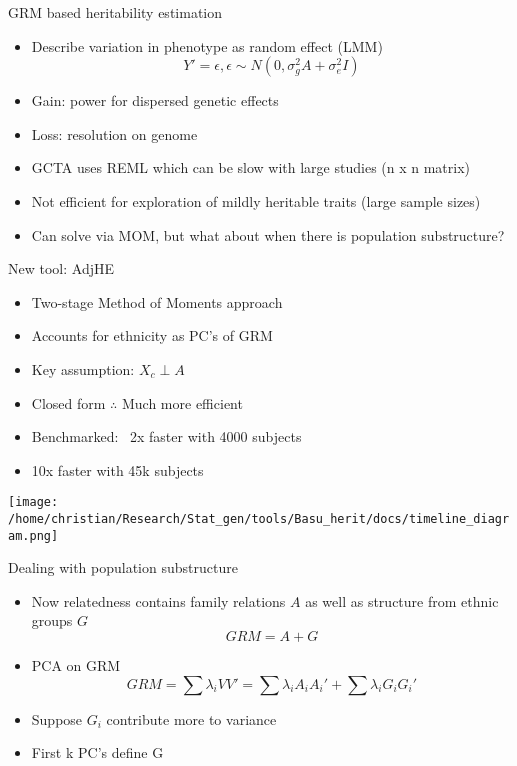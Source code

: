 \documentclass[
  ignorenonframetext,
]{beamer}
\begin{document}
\begin{frame}{GRM based heritability estimation}
\begin{itemize}
	\item Describe variation in phenotype as random effect (LMM)
		$$ Y' = \epsilon, \epsilon \sim N(0, \sigma_g^2 A + \sigma_e^2 I)$$
	\item Gain: power for dispersed genetic effects
	\item Loss: resolution on genome
	\item GCTA uses REML which can be slow with large studies (n x n matrix)
	\item Not efficient for exploration of mildly heritable traits (large sample sizes)
	\item Can solve via MOM, but what about when there is population substructure?
\end{itemize}
\end{frame}

\begin{frame}{New tool: AdjHE}
	\begin{itemize}
		\item Two-stage Method of Moments approach
		\item Accounts for ethnicity as PC's of GRM
		\item Key assumption: $X_c \perp A$
		\item Closed form $\therefore$ Much more efficient 
		\item Benchmarked: ~2x faster with 4000 subjects
		\item 10x faster with 45k subjects
	\end{itemize}
	 \texttt{[image: /home/christian/Research/Stat\_gen/tools/Basu\_herit/docs/timeline\_diagram.png]}
\end{frame}



\begin{frame}{Dealing with population substructure}
\begin{itemize}
	\item Now relatedness contains family relations $A$ as well as structure from ethnic groups $G$
	$$ GRM = A + G$$
	\item PCA on GRM
	$$GRM = \sum \lambda_i VV' = \sum \lambda_i A_iA_i' + \sum \lambda_i G_iG_i' $$
	\item Suppose $G_i$ contribute more to variance
	\item First k PC's define G
\end{itemize}
\end{frame}
\end{document}
